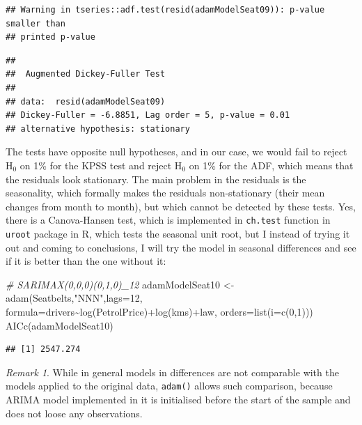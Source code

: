 \documentclass[
]{book}
\newenvironment{Shaded}{\begin{snugshade}}{\end{snugshade}}
\newcommand{\AttributeTok}[1]{\textcolor[rgb]{0.77,0.63,0.00}{#1}}
\newcommand{\CommentTok}[1]{\textcolor[rgb]{0.56,0.35,0.01}{\textit{#1}}}
\newcommand{\DecValTok}[1]{\textcolor[rgb]{0.00,0.00,0.81}{#1}}
\newcommand{\FunctionTok}[1]{\textcolor[rgb]{0.00,0.00,0.00}{#1}}
\newcommand{\NormalTok}[1]{#1}
\newcommand{\OtherTok}[1]{\textcolor[rgb]{0.56,0.35,0.01}{#1}}
\newcommand{\SpecialCharTok}[1]{\textcolor[rgb]{0.00,0.00,0.00}{#1}}
\newcommand{\StringTok}[1]{\textcolor[rgb]{0.31,0.60,0.02}{#1}}
\theoremstyle{definition}
\theoremstyle{definition}
\theoremstyle{definition}
\theoremstyle{definition}
\theoremstyle{remark}
\newtheorem*{remark}{Remark}
\begin{document}
\begin{verbatim}
## Warning in tseries::adf.test(resid(adamModelSeat09)): p-value smaller than
## printed p-value
\end{verbatim}

\begin{verbatim}
## 
##  Augmented Dickey-Fuller Test
## 
## data:  resid(adamModelSeat09)
## Dickey-Fuller = -6.8851, Lag order = 5, p-value = 0.01
## alternative hypothesis: stationary
\end{verbatim}

The tests have opposite null hypotheses, and in our case, we would fail to reject H\(_0\) on 1\% for the KPSS test and reject H\(_0\) on 1\% for the ADF, which means that the residuals look stationary. The main problem in the residuals is the seasonality, which formally makes the residuals non-stationary (their mean changes from month to month), but which cannot be detected by these tests. Yes, there is a Canova-Hansen test, which is implemented in \texttt{ch.test} function in \texttt{uroot} package in R, which tests the seasonal unit root, but I instead of trying it out and coming to conclusions, I will try the model in seasonal differences and see if it is better than the one without it:

\begin{Shaded}
\begin{Highlighting}[]
\CommentTok{\# SARIMAX(0,0,0)(0,1,0)\_12}
\NormalTok{adamModelSeat10 }\OtherTok{\textless{}{-}} \FunctionTok{adam}\NormalTok{(Seatbelts,}\StringTok{"NNN"}\NormalTok{,}\AttributeTok{lags=}\DecValTok{12}\NormalTok{,}
                        \AttributeTok{formula=}\NormalTok{drivers}\SpecialCharTok{\textasciitilde{}}\FunctionTok{log}\NormalTok{(PetrolPrice)}\SpecialCharTok{+}\FunctionTok{log}\NormalTok{(kms)}\SpecialCharTok{+}\NormalTok{law,}
                        \AttributeTok{orders=}\FunctionTok{list}\NormalTok{(}\AttributeTok{i=}\FunctionTok{c}\NormalTok{(}\DecValTok{0}\NormalTok{,}\DecValTok{1}\NormalTok{)))}
\FunctionTok{AICc}\NormalTok{(adamModelSeat10)}
\end{Highlighting}
\end{Shaded}

\begin{verbatim}
## [1] 2547.274
\end{verbatim}

\begin{remark}
While in general models in differences are not comparable with the models applied to the original data, \texttt{adam()} allows such comparison, because ARIMA model implemented in it is initialised before the start of the sample and does not loose any observations.
\end{remark}
\end{document}
